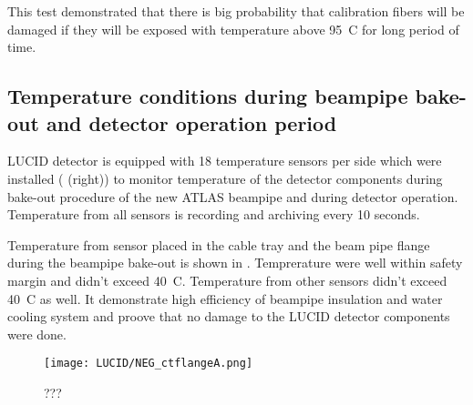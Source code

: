 This test demonstrated that there is big probability that calibration fibers will be damaged if they will be exposed 
with temperature above 95\degree~C for long period of time.

% 
% 

 
\subsection{Temperature conditions during beampipe bake-out and detector operation period}

LUCID detector is equipped with 18 temperature sensors per side which were installed ( (right))
to monitor temperature of the detector components during bake-out procedure of the new ATLAS beampipe and during detector operation.
Temperature from all sensors is recording and archiving every 10 seconds.

Temperature from sensor placed in the cable tray and the beam pipe flange during the beampipe bake-out is shown in .
Temprerature were well within safety margin and didn't exceed 40\degree~C. Temperature from other sensors didn't exceed 40\degree~C as well.
It demonstrate high efficiency of beampipe insulation and water cooling system and proove that no damage to the LUCID detector components were done.

\begin{figure}
\centering
\texttt{[image: LUCID/NEG\_ctflangeA.png]}
\caption{???}
\label{fig:NEG_ctflangeA}
\end{figure}
 


